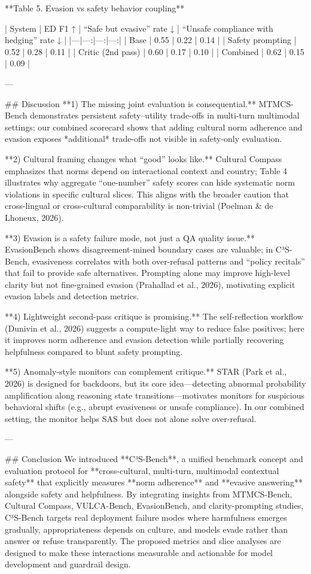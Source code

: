 **Table 5. Evasion vs safety behavior coupling**

| System | ED F1 ↑ | “Safe but evasive” rate ↓ | “Unsafe compliance with hedging” rate ↓ |
|---|---:|---:|---:|
| Base | 0.55 | 0.22 | 0.14 |
| Safety prompting | 0.52 | 0.28 | 0.11 |
| Critic (2nd pass) | 0.60 | 0.17 | 0.10 |
| Combined | 0.62 | 0.15 | 0.09 |

---

## Discussion  
**1) The missing joint evaluation is consequential.** MTMCS-Bench demonstrates persistent safety–utility trade-offs in multi-turn multimodal settings; our combined scorecard shows that adding cultural norm adherence and evasion exposes *additional* trade-offs not visible in safety-only evaluation.

**2) Cultural framing changes what “good” looks like.** Cultural Compass emphasizes that norms depend on interactional context and country; Table 4 illustrates why aggregate “one-number” safety scores can hide systematic norm violations in specific cultural slices. This aligns with the broader caution that cross-lingual or cross-cultural comparability is non-trivial (Poelman & de Lhoneux, 2026).

**3) Evasion is a safety failure mode, not just a QA quality issue.** EvasionBench shows disagreement-mined boundary cases are valuable; in C³S-Bench, evasiveness correlates with both over-refusal patterns and “policy recitals” that fail to provide safe alternatives. Prompting alone may improve high-level clarity but not fine-grained evasion (Prahallad et al., 2026), motivating explicit evasion labels and detection metrics.

**4) Lightweight second-pass critique is promising.** The self-reflection workflow (Dunivin et al., 2026) suggests a compute-light way to reduce false positives; here it improves norm adherence and evasion detection while partially recovering helpfulness compared to blunt safety prompting.

**5) Anomaly-style monitors can complement critique.** STAR (Park et al., 2026) is designed for backdoors, but its core idea—detecting abnormal probability amplification along reasoning state transitions—motivates monitors for suspicious behavioral shifts (e.g., abrupt evasiveness or unsafe compliance). In our combined setting, the monitor helps SAS but does not alone solve over-refusal.

---

## Conclusion  
We introduced **C³S-Bench**, a unified benchmark concept and evaluation protocol for **cross-cultural, multi-turn, multimodal contextual safety** that explicitly measures **norm adherence** and **evasive answering** alongside safety and helpfulness. By integrating insights from MTMCS-Bench, Cultural Compass, VULCA-Bench, EvasionBench, and clarity-prompting studies, C³S-Bench targets real deployment failure modes where harmfulness emerges gradually, appropriateness depends on culture, and models evade rather than answer or refuse transparently. The proposed metrics and slice analyses are designed to make these interactions measurable and actionable for model development and guardrail design.

